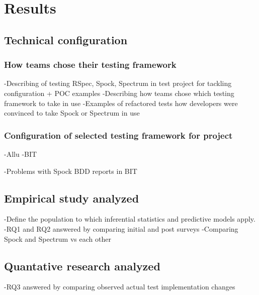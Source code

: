 \chapter{Results}
\label{chapter:Results}

\section{Technical configuration}
\subsection{How teams chose their testing framework}
    -Describing of testing RSpec, Spock, Spectrum in test project for tackling configuration + POC examples\newline
    -Describing how teams chose which testing framework to take in use\newline
    -Examples of refactored tests how developers were convinced to take Spock or Spectrum in use\newline
\subsection{Configuration of selected testing framework for project}
    -Allu\newline
    -BIT

    -Problems with Spock BDD reports in BIT\newline


\section{Empirical study analyzed}
-Define the population to which inferential statistics and predictive models apply.\newline
-RQ1 and RQ2 answered by comparing initial and post surveys\newline
-Comparing Spock and Spectrum vs each other\newline

\section{Quantative research analyzed}
-RQ3 answered by comparing observed actual test implementation changes\newline

